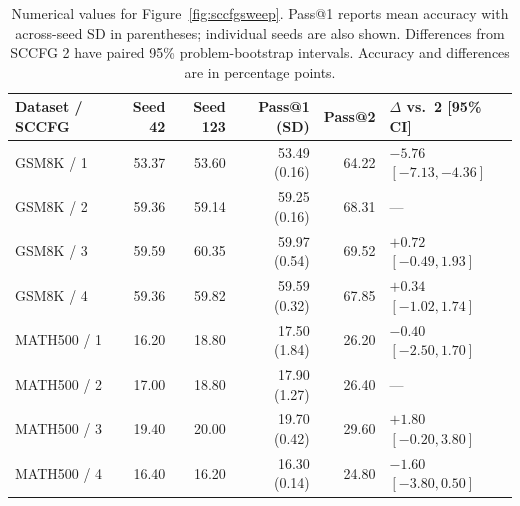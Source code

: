 \begin{table}[htbp]
\caption{Numerical values for Figure~\ref{fig:sccfgsweep}. Pass@1 reports mean accuracy with across-seed SD in parentheses; individual seeds are also shown. Differences from SCCFG 2 have paired 95\% problem-bootstrap intervals. Accuracy and differences are in percentage points.}
\label{tab:sccfgsweepvalues}
\centering\small
\setlength{\tabcolsep}{4pt}
\begin{tabular}{@{}lrrrrl@{}}
\toprule
Dataset / SCCFG & Seed 42 & Seed 123 & Pass@1 (SD) & Pass@2 & $\Delta$ vs.\ 2 [95\% CI] \\
\midrule
GSM8K / 1 & 53.37 & 53.60 & 53.49 {\scriptsize (0.16)} & 64.22 & $-5.76$ $[-7.13, -4.36]$ \\
GSM8K / 2 & 59.36 & 59.14 & 59.25 {\scriptsize (0.16)} & 68.31 & --- \\
GSM8K / 3 & 59.59 & 60.35 & 59.97 {\scriptsize (0.54)} & 69.52 & $+0.72$ $[-0.49, 1.93]$ \\
GSM8K / 4 & 59.36 & 59.82 & 59.59 {\scriptsize (0.32)} & 67.85 & $+0.34$ $[-1.02, 1.74]$ \\
\midrule
MATH500 / 1 & 16.20 & 18.80 & 17.50 {\scriptsize (1.84)} & 26.20 & $-0.40$ $[-2.50, 1.70]$ \\
MATH500 / 2 & 17.00 & 18.80 & 17.90 {\scriptsize (1.27)} & 26.40 & --- \\
MATH500 / 3 & 19.40 & 20.00 & 19.70 {\scriptsize (0.42)} & 29.60 & $+1.80$ $[-0.20, 3.80]$ \\
MATH500 / 4 & 16.40 & 16.20 & 16.30 {\scriptsize (0.14)} & 24.80 & $-1.60$ $[-3.80, 0.50]$ \\
\bottomrule
\end{tabular}
\end{table}
